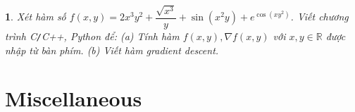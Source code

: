 \documentclass{article}
\newtheorem{baitoan}{}
\begin{document}
\begin{baitoan}
	Xét hàm số $f(x,y) = 2x^3y^2 + \dfrac{\sqrt{x^3}}{y} + \sin(x^2y) + e^{\cos(xy^2)}$. Viết chương trình {\sf C{\tt/}C++, Python} để: (a) Tính hàm $f(x,y),\nabla f(x,y)$ với $x,y\in\mathbb{R}$ được nhập từ bàn phím. (b) Viết hàm gradient descent.
\end{baitoan}


\section{Miscellaneous}


\printbibliography[heading=bibintoc]
	
\end{document}
